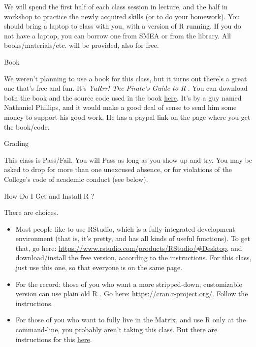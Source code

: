 \documentclass[11pt,letterpaper]{article}
\newcommand{\R}[0]{\textsf{R }}
\begin{document}
We will spend the first half of each class session in lecture, and the half in workshop to practice the newly acquired skills (or to do your homework).  You should bring a laptop to class with you, with a version of \R running. If you do not have a laptop, you can borrow one from SMEA or from the library.  All books/materials/etc. will be provided, also for free. 

{\Large Book}\hrulefill

We weren't planning to use a book for this class, but it turns out there's a great one that's free and fun.  It's \textit{YaRrr! The Pirate's Guide to \R}.  You can download both the book and the source code used in the book \href{https://ndphillips.github.io/piratesguide.html}{\underline{here}}.  It's by a guy named Nathaniel Phillips, and it would make a good deal of sense to send him some money to support his good work. He has a paypal link on the page where you get the book/code. 

{\Large Grading}\hrulefill

This class is Pass/Fail. You will Pass as long as you show up and try. You may be asked to drop for more than one unexcused absence, or for violations of the College's code of academic conduct (see below).


{\Large How Do I Get and Install \R?}\hrulefill

There are choices.
\begin{itemize}
	\item  Most people like to use \textsf{RStudio}, which is a fully-integrated development environment (that is, it's pretty, and has all kinds of useful functions).  To get that, go here: \url{https://www.rstudio.com/products/RStudio/#Desktop}, and download/install the free version, according to the instructions. For this class, just use this one, so that everyone is on the same page. 
	\item For the record: those of you who want a more stripped-down, customizable version can use plain old \R. Go here: \url{https://cran.r-project.org/}. Follow the instructions. 
	\item For those of you who want to fully live in the Matrix,  and use \R only at the command-line, you probably aren't taking this class.  But there are instructions for this \href{https://cran.r-project.org/doc/manuals/r-patched/R-admin.html#Getting-and-unpacking-the-sources}{\underline{here}}.

\end{itemize}
\end{document}
